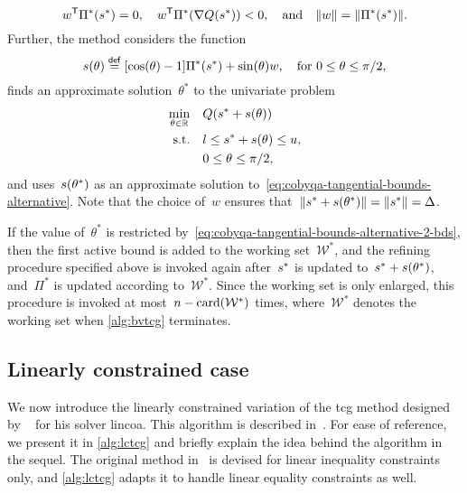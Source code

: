 \begin{equation*}
    w^{\T} \Pi^{\ast}(\sstep[\ast]) = 0, \quad w^{\T} \Pi^{\ast}(\nabla Q(\sstep[\ast])) < 0, \quad \text{and} \quad \norm{w} = \norm{\Pi^{\ast}(\sstep[\ast])}.
\end{equation*}
Further, the method considers the function
\begin{equation*}
    \sstep(\theta) \eqdef [\cos(\theta) - 1] \Pi^{\ast}(\sstep[\ast]) + \sin(\theta) w, \quad \text{for~$0 \le \theta \le \pi / 2$,}
\end{equation*}
finds an approximate solution~$\theta^{\ast}$ to the univariate problem
\begin{subequations}
    \begin{align}
        \min_{\theta \in \R}    & \quad Q(\sstep[\ast] + \sstep(\theta))\\
        \text{s.t.}             & \quad \xl \le \sstep[\ast] + \sstep(\theta) \le \xu, \label{eq:cobyqa-tangential-bounds-alternative-2-bds}\\
                                & \quad 0 \le \theta \le \pi / 2,
    \end{align}
\end{subequations}
and uses~$\sstep(\theta^{\ast})$ as an approximate solution to~\cref{eq:cobyqa-tangential-bounds-alternative}.
Note that the choice of~$w$ ensures that~$\norm{\sstep[\ast] + \sstep(\theta^{\ast})} = \norm{\sstep[\ast]} = \rad$.

If the value of~$\theta^{\ast}$ is restricted by~\cref{eq:cobyqa-tangential-bounds-alternative-2-bds}, then the first active bound is added to the working set~$\mathcal{W}^{\ast}$, and the refining procedure specified above is invoked again after~$\sstep[\ast]$ is updated to~$\sstep[\ast] + \sstep(\theta^{\ast})$, and~$\Pi^{\ast}$ is updated according to~$\mathcal{W}^{\ast}$.
Since the working set is only enlarged, this procedure is invoked at most~$n - \operatorname{card}(\mathcal{W}^{\ast})$ times, where~$\mathcal{W}^{\ast}$ denotes the working set when \cref{alg:bvtcg} terminates.

\subsection{Linearly constrained case}
\label{subsec:lctcg}

We now introduce the linearly constrained variation of the \gls{tcg} method designed by \citeauthor{Powell_2015}~\cite{Powell_2015} for his solver \gls{lincoa}.
This algorithm is described in~\cite[\S~3,\S~5]{Powell_2015}.
For ease of reference, we present it in \cref{alg:lctcg} and briefly explain the idea behind the algorithm in the sequel.
The original method in~\cite{Powell_2015} is devised for linear inequality constraints only, and \cref{alg:lctcg} adapts it to handle linear equality constraints as well.

